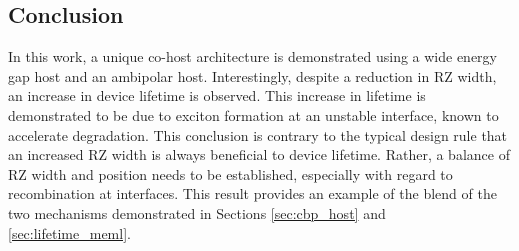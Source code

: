 \documentclass[../thesis.tex]{subfiles}
\begin{document}
\subsection{Conclusion}
In this work, a unique co-host architecture is demonstrated using a wide energy gap host and an ambipolar host. 
Interestingly, despite a reduction in RZ width, an increase in device lifetime is observed. 
This increase in lifetime is demonstrated to be due to exciton formation at an unstable interface, known to accelerate degradation. 
This conclusion is contrary to the typical design rule that an increased RZ width is always beneficial to device lifetime. 
Rather, a balance of RZ width and position needs to be established, especially with regard to recombination at interfaces.
This result provides an example of the blend of the two mechanisms demonstrated in Sections \ref{sec:cbp_host} and \ref{sec:lifetime_meml}.


\end{document}
